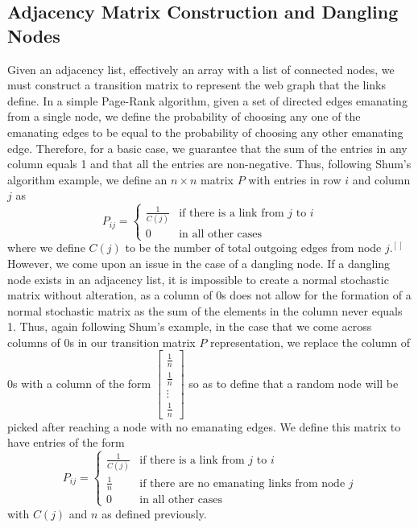\documentclass{article}
\begin{document}
    \subsection{Adjacency Matrix Construction and Dangling Nodes}
    Given an adjacency list, effectively an array with a list of connected nodes, we must construct a transition matrix to represent the web graph that the links define. In a simple Page-Rank algorithm, given a set of directed edges emanating from a single node, we define the probability of choosing any one of the emanating edges to be equal to the probability of choosing any other emanating edge. Therefore, for a basic case, we guarantee that the sum of the entries in any column equals 1 and that all the entries are non-negative. Thus, following Shum's algorithm example, we define an $n \times n$ matrix $P$ with entries in row $i$ and column $j$ as
    \[ P_{ij} =
    \begin{cases} 
      \frac{1}{C(j)} & \text{if there is a link from $j$ to $i$} \\
      0 & \text{in all other cases}
   \end{cases}
    \]
    where we define $C(j)$ to be the number of total outgoing edges from node $j$.$^{[]}$ However, we come upon an issue in the case of a dangling node. If a dangling node exists in an adjacency list, it is impossible to create a normal stochastic matrix without alteration, as a column of 0s does not allow for the formation of a normal stochastic matrix as the sum of the elements in the column never equals 1. Thus, again following Shum's example, in the case that we come across columns of 0s in our transition matrix $P$ representation, we replace the column of 0s with a column of the form $\begin{bmatrix} \frac{1}{n} \\ \frac{1}{n} \\ \vdots \\ \frac{1}{n} \end{bmatrix}$ so as to define that a random node will be picked after reaching a node with no emanating edges. We define this matrix to have entries of the form
    \[ P_{ij} =
    \begin{cases} 
      \frac{1}{C(j)} & \text{if there is a link from $j$ to $i$} \\
      \frac{1}{n} & \text{if there are no emanating links from node $j$} \\
      0 & \text{in all other cases}
   \end{cases}
    \]
    with $C(j)$ and $n$ as defined previously.
    
\end{document}
